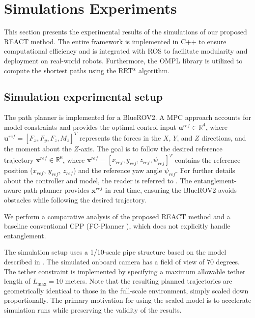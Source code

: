 \section{Simulations Experiments}
\label{sec:simulationexperiments}

This section presents the experimental results of the simulations of our proposed \ac{REACT} method. The entire framework is implemented in C++ to ensure computational efficiency and is integrated with ROS to facilitate modularity and deployment on real-world robots. Furthermore, the \ac{OMPL} library \cite{ompl} is utilized to compute the shortest paths using the RRT* algorithm.  

\subsection{Simulation experimental setup}
The path planner is implemented for a BlueROV2. A \ac{MPC} approach accounts for model constraints and provides the optimal control input $\mathbf{u}^{ref} \in \mathbb{R}^4$, where $\mathbf{u}^{ref} = [F_x, F_y, F_z, M_z]^T$ represents the forces in the $X$, $Y$, and $Z$ directions, and the moment about the $Z$-axis. The goal is to follow the desired reference trajectory $\mathbf{x}^{ref} \in \mathbb{R}^6$, where $\mathbf{x}^{ref} = [x_{ref}, y_{ref}, z_{ref}, \psi_{ref}]^T$ contains the reference position ($x_{ref}$, $y_{ref}$, $z_{ref}$) and the reference yaw angle $\psi_{ref}$. For further details about the controller and model, the reader is referred to \cite{amergp}. The entanglement-aware path planner provides $\mathbf{x}^{ref}$ in real time, ensuring the BlueROV2 avoids obstacles while following the desired trajectory. 

We perform a comparative analysis of the proposed \ac{REACT} method and a baseline conventional \ac{CPP} (FC-Planner \cite{feng2024fc}), which does not explicitly handle entanglement. 

The simulation setup uses a 1/10-scale pipe structure based on the model described in \cite{feng2024fc}. The simulated onboard camera has a field of view of 70 degrees. The tether constraint is implemented by specifying a maximum allowable tether length of \(L_{\text{max}} = 10\) meters. Note that the resulting planned trajectories are geometrically identical to those in the full-scale environment, simply scaled down proportionally. The primary motivation for using the scaled model is to accelerate simulation runs while preserving the validity of the results.

